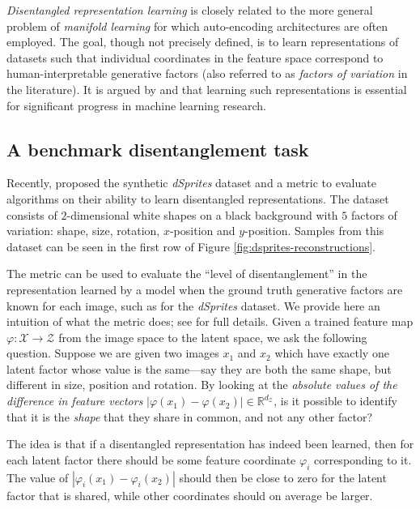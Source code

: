 \documentclass{article}
\def\X{\mathcal{X}}
\def\dZ{d_{\mathcal{Z}}}
\def\Z{\mathcal{Z}}
\def\R{\mathbb{R}}
\begin{document}
\emph{Disentangled representation learning} is closely related to the more general problem of \emph{manifold learning} for which auto-encoding architectures are often employed. The goal, though not precisely defined, is to learn representations of datasets such that individual coordinates in the feature space correspond to human-interpretable generative factors  (also referred to as \emph{factors of variation} in the literature). It is argued by \citet{bengio2013representation} and \citet{lake2017building} that learning such representations is essential for significant progress in machine learning research.

\subsection{A benchmark disentanglement task}

Recently, \citet{HM+17} proposed the synthetic \emph{dSprites} dataset and a metric to evaluate algorithms on their ability to learn disentangled representations. The dataset consists of $2$-dimensional white shapes on a black background with $5$ factors of variation: shape, size, rotation, $x$-position and $y$-position. Samples from this dataset can be seen in the first row of Figure \ref{fig:dsprites-reconstructions}.

The metric can be used to evaluate the ``level of disentanglement'' in the representation learned by a model when the ground truth generative factors are known for each image, such as for the \emph{dSprites} dataset. We provide here an intuition of what the metric does; see \citet{HM+17} for full details. Given a trained feature map $\varphi\colon \X\to\Z$ from the image space to the latent space, we ask the following question. Suppose we are given two images $x_1$ and $x_2$ which have exactly one latent factor whose value is the same---say they are both the same shape, but different in size, position and rotation. 
 By looking at the \emph{absolute values of the difference in feature vectors} ${|\varphi(x_1) - \varphi(x_2)|}\in\R^{\dZ}$, is it possible to identify that it is the \emph{shape} that they share in common, and not any other factor?

The idea is that if a disentangled representation has indeed been learned, then for each latent factor there should be some feature coordinate $\varphi_i$ corresponding to it. The value of ${|\varphi_i(x_1) - \varphi_i(x_2)|}$ should then be close to zero for the latent factor that is shared, while other coordinates should on average be larger. 
\end{document}
